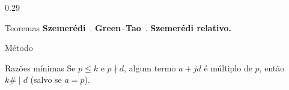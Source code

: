 \documentclass[final]{beamer}
\newcommand{\tablesdir}{../../paper/tables}
\begin{document}
\begin{frame}[t]
\begin{columns}[T]
  \begin{column}{0.29\paperwidth}
    \begin{block}{Teoremas}
      \textbf{Szemerédi}~\cite{szemeredi1975}. \enunciadoSzemeredi
      \vskip0.6cm
      \textbf{Green--Tao}~\cite{green2008primes}. \enunciadoGreenTao
      \vskip0.6cm
      \textbf{Szemerédi relativo.} \enunciadoRelativo
    \end{block}
    \begin{block}{Método}
      
    \end{block}
    \begin{block}{Razões mínimas}
      Se $p \le k$ e $p \nmid d$, algum termo $a + jd$ é múltiplo de $p$, então $k\# \mid d$ (salvo se $a = p$).
      \vskip0.6cm
      \begin{center}\end{center}
    \end{block}
  \end{column}


\end{columns}
\end{frame}
\end{document}
